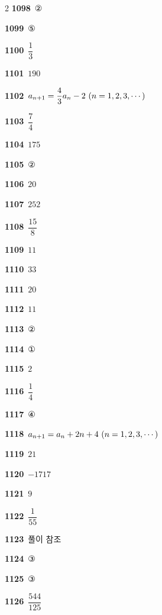 \documentclass[10pt,a4paper]{article}
\begin{document}
\begin{multicols}{2}
\noindent\textbf{1098}\ ②\par
\noindent\textbf{1099}\ ⑤\par
\noindent\textbf{1100}\ $\dfrac{1}{3}$\par
\noindent\textbf{1101}\ $190$\par
\noindent\textbf{1102}\ $a_{n+1}=\dfrac{4}{3}a_n-2\ (n=1{,}\mkern3mu\mathopen{}2{,}\mkern3mu\mathopen{}3{,}\mkern3mu\mathopen{}\cdots)$\par
\noindent\textbf{1103}\ $\dfrac{7}{4}$\par
\noindent\textbf{1104}\ $175$\par
\noindent\textbf{1105}\ ②\par
\noindent\textbf{1106}\ $20$\par
\noindent\textbf{1107}\ $252$\par
\noindent\textbf{1108}\ $\dfrac{15}{8}$\par
\noindent\textbf{1109}\ $11$\par
\noindent\textbf{1110}\ $33$\par
\noindent\textbf{1111}\ $20$\par
\noindent\textbf{1112}\ $11$\par
\noindent\textbf{1113}\ ②\par
\noindent\textbf{1114}\ ①\par
\noindent\textbf{1115}\ $2$\par
\noindent\textbf{1116}\ $\dfrac{1}{4}$\par
\noindent\textbf{1117}\ ④\par
\noindent\textbf{1118}\ $a_{n+1}=a_n+2n+4\ (n=1{,}\mkern3mu\mathopen{}2{,}\mkern3mu\mathopen{}3{,}\mkern3mu\mathopen{}\cdots)$\par
\noindent\textbf{1119}\ $21$\par
\noindent\textbf{1120}\ $-1717$\par
\noindent\textbf{1121}\ $9$\par
\noindent\textbf{1122}\ $\dfrac{1}{55}$\par
\noindent\textbf{1123}\ 풀이 참조\par
\noindent\textbf{1124}\ ③\par
\noindent\textbf{1125}\ ③\par
\noindent\textbf{1126}\ $\dfrac{544}{125}$\par
\end{multicols}
\end{document}
